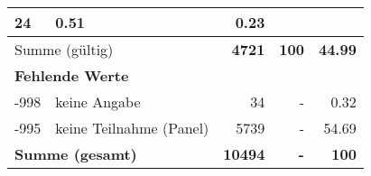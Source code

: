 \begin{longtable}{lXrrr}
       \num{24} &
       \num[round-mode=places,round-precision=2]{0,51} &
         \num[round-mode=places,round-precision=2]{0,23} \\
     \midrule
     \multicolumn{2}{l}{Summe (gültig)} &
       \textbf{\num{4721}} &
     \textbf{100} &
       \textbf{\num[round-mode=places,round-precision=2]{44,99}} \\
     \multicolumn{5}{l}{\textbf{Fehlende Werte}}\\
       -998 &
       keine Angabe &
         \num{34} &
        - &
         \num[round-mode=places,round-precision=2]{0,32} \\
       -995 &
       keine Teilnahme (Panel) &
         \num{5739} &
        - &
         \num[round-mode=places,round-precision=2]{54,69} \\
     \midrule
     \multicolumn{2}{l}{\textbf{Summe (gesamt)}} &
          \textbf{\num{10494}} &
        \textbf{-} &
        \textbf{100} \\
     \bottomrule
     \end{longtable}
     
